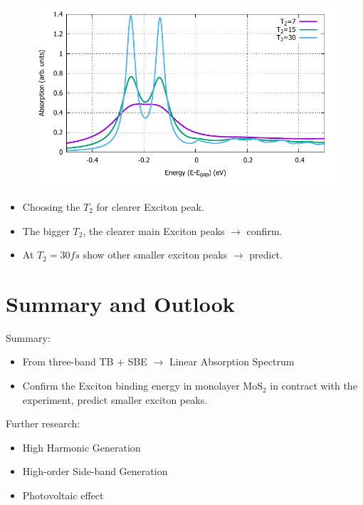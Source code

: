 \documentclass{beamer}
\begin{document}
\begin{frame}
		\begin{figure}
			\includegraphics[width=0.8\linewidth]{images/varyT2.pdf}
		\end{figure}
	
	\begin{itemize}
	\item Choosing the $T_2$ for clearer Exciton peak.
	\item The bigger $T_2$, the clearer main Exciton peaks $\to $ confirm.
	\item At $T_2 = 30 fs$ show other smaller exciton peaks $\to $ predict.
	\end{itemize}
\end{frame}
	\section{Summary and Outlook}
	\begin{frame}
		Summary:
		\begin{itemize}
	\item From three-band TB + SBE $\to $ Linear Absorption Spectrum
	\item Confirm the Exciton binding energy in monolayer $\mathrm{MoS}_2$ in contract with the experiment, predict smaller exciton peaks.
		\end{itemize}
	Further research:
	\begin{itemize}
		\item High Harmonic Generation
		\item High-order Side-band Generation
		\item Photovoltaic effect
	\end{itemize}
	\end{frame}
\end{document}
